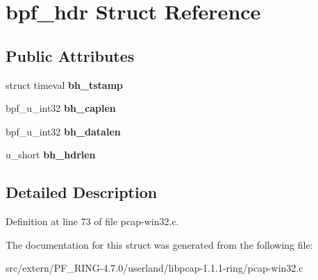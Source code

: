 \hypertarget{structbpf__hdr}{
\section{bpf\_\-hdr Struct Reference}
\label{structbpf__hdr}
}
\subsection*{Public Attributes}
\begin{DoxyCompactItemize}
\item 
\hypertarget{structbpf__hdr_a086ebd19a4a5de5e9970fd4e1fb1a2a3}{
struct timeval {\bfseries bh\_\-tstamp}}
\label{structbpf__hdr_a086ebd19a4a5de5e9970fd4e1fb1a2a3}

\item 
\hypertarget{structbpf__hdr_a4b81d1ac3fa83f052b62773ce0a106a4}{
bpf\_\-u\_\-int32 {\bfseries bh\_\-caplen}}
\label{structbpf__hdr_a4b81d1ac3fa83f052b62773ce0a106a4}

\item 
\hypertarget{structbpf__hdr_a8902a0848283de0dc16d94d7bdc8cf51}{
bpf\_\-u\_\-int32 {\bfseries bh\_\-datalen}}
\label{structbpf__hdr_a8902a0848283de0dc16d94d7bdc8cf51}

\item 
\hypertarget{structbpf__hdr_ab4319f51867f89589fed66bc40c2771e}{
u\_\-short {\bfseries bh\_\-hdrlen}}
\label{structbpf__hdr_ab4319f51867f89589fed66bc40c2771e}

\end{DoxyCompactItemize}


\subsection{Detailed Description}


Definition at line 73 of file pcap-\/win32.c.



The documentation for this struct was generated from the following file:\begin{DoxyCompactItemize}
\item 
src/extern/PF\_\-RING-\/4.7.0/userland/libpcap-\/1.1.1-\/ring/pcap-\/win32.c\end{DoxyCompactItemize}
